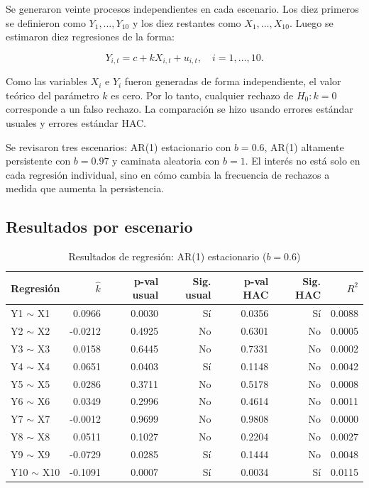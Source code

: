 \documentclass[11pt,a4paper]{article}
\begin{document}
Se generaron veinte procesos independientes en cada escenario. Los diez primeros se definieron como $Y_1,\dots,Y_{10}$ y los diez restantes como $X_1,\dots,X_{10}$. Luego se estimaron diez regresiones de la forma:

\begin{equation}
Y_{i,t}=c+kX_{i,t}+u_{i,t}, \quad i=1,\dots,10.
\end{equation}

Como las variables $X_i$ e $Y_i$ fueron generadas de forma independiente, el valor teórico del parámetro $k$ es cero. Por lo tanto, cualquier rechazo de $H_0:k=0$ corresponde a un falso rechazo. La comparación se hizo usando errores estándar usuales y errores estándar HAC.

Se revisaron tres escenarios: AR(1) estacionario con $b=0.6$, AR(1) altamente persistente con $b=0.97$ y caminata aleatoria con $b=1$. El interés no está solo en cada regresión individual, sino en cómo cambia la frecuencia de rechazos a medida que aumenta la persistencia.

\subsection{Resultados por escenario}

\begin{table}[H]
\centering
\caption{Resultados de regresión: AR(1) estacionario ($b=0.6$)}
\scriptsize
\begin{tabular}{lrrrrrr}
\toprule
Regresión & $\hat{k}$ & p-val usual & Sig. usual & p-val HAC & Sig. HAC & $R^2$ \\
\midrule
Y1 $\sim$ X1 & 0.0966 & 0.0030 & Sí & 0.0356 & Sí & 0.0088 \\
Y2 $\sim$ X2 & -0.0212 & 0.4925 & No & 0.6301 & No & 0.0005 \\
Y3 $\sim$ X3 & 0.0158 & 0.6445 & No & 0.7331 & No & 0.0002 \\
Y4 $\sim$ X4 & 0.0651 & 0.0403 & Sí & 0.1148 & No & 0.0042 \\
Y5 $\sim$ X5 & 0.0286 & 0.3711 & No & 0.5178 & No & 0.0008 \\
Y6 $\sim$ X6 & 0.0349 & 0.2996 & No & 0.4614 & No & 0.0011 \\
Y7 $\sim$ X7 & -0.0012 & 0.9699 & No & 0.9808 & No & 0.0000 \\
Y8 $\sim$ X8 & 0.0511 & 0.1027 & No & 0.2204 & No & 0.0027 \\
Y9 $\sim$ X9 & -0.0729 & 0.0285 & Sí & 0.1444 & No & 0.0048 \\
Y10 $\sim$ X10 & -0.1091 & 0.0007 & Sí & 0.0034 & Sí & 0.0115 \\
\bottomrule
\end{tabular}
\end{table}
\end{document}
